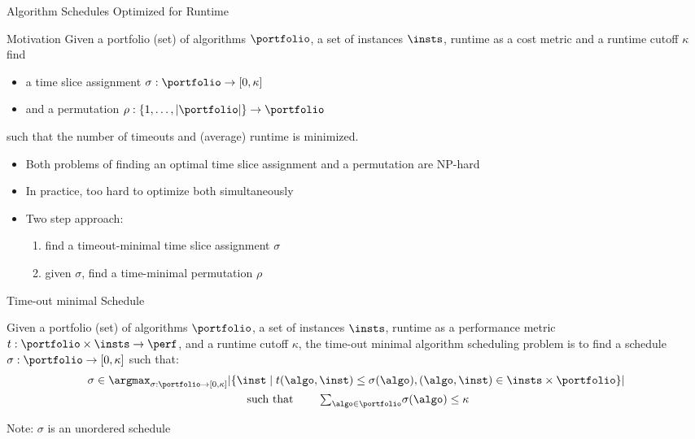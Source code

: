 \begin{frame}[c]{Algorithm Schedules Optimized for Runtime}

\begin{block}{Motivation}
Given a portfolio (set) of algorithms $\portfolio$, a set of instances $\insts$,
runtime as a cost metric and a runtime cutoff $\kappa$
find 
\begin{itemize}
  \item a time slice assignment $\sigma: \portfolio\rightarrow[0,\kappa]$
  \item and a permutation $\rho:\{1,\dots,|\portfolio|\}\rightarrow \portfolio$ 
\end{itemize}
such that the number of timeouts and (average) runtime is minimized.
\end{block}

\pause

\begin{itemize}
  \item Both problems of finding an optimal time slice assignment and a permutation are NP-hard
  \item In practice, too hard to optimize both simultaneously
  \pause 
  \item Two step approach: 
  \begin{enumerate}
    \item find a timeout-minimal time slice assignment $\sigma$
    \item given $\sigma$, find a time-minimal permutation $\rho$
  \end{enumerate}
\end{itemize}
 
\end{frame}
\begin{frame}[c]{Time-out minimal Schedule~}

\begin{definition}
Given a portfolio (set) of algorithms $\portfolio$, a set of instances $\insts$,
runtime as a performance metric $t: \portfolio \times \insts \to \perf$,
and a runtime cutoff $\kappa$,
the time-out minimal algorithm scheduling problem 
is to find a schedule $\sigma: \portfolio\rightarrow[0,\kappa]$ such that: 
\[
  \begin{array}{c}
    \sigma
    \in
    \argmax_{\sigma:\portfolio\rightarrow[0,\kappa]}
    |\{\inst \mid t(\algo,\inst)\leq\sigma(\algo), (\algo,\inst)\in{\insts\times \portfolio}\}|
    \\[5pt]
    \text{ such that }\qquad
    \textstyle{\sum}_{\algo \in \portfolio}{\sigma(\algo)} \leq \kappa
  \end{array}
\]
\end{definition}

\medskip
Note: $\sigma$ is an unordered schedule
 
\end{frame}

